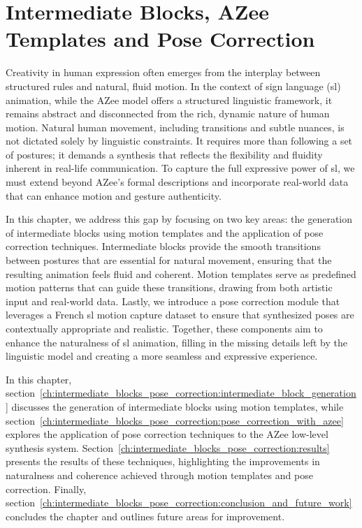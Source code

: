 \documentclass[../../main.tex]{subfiles}
\begin{document}
\chapter{Intermediate Blocks, AZee Templates and Pose Correction}
\label{ch:intermediate_blocks_pose_correction}

Creativity in human expression often emerges from the interplay between structured rules and natural, fluid motion. In the context of sign language (\gls{sl}) animation, while the AZee model offers a structured linguistic framework, it remains abstract and disconnected from the rich, dynamic nature of human motion. Natural human movement, including transitions and subtle nuances, is not dictated solely by linguistic constraints. It requires more than following a set of postures; it demands a synthesis that reflects the flexibility and fluidity inherent in real-life communication. To capture the full expressive power of \gls{sl}, we must extend beyond AZee's formal descriptions and incorporate real-world data that can enhance motion and gesture authenticity.

In this chapter, we address this gap by focusing on two key areas: the generation of intermediate blocks using motion templates and the application of pose correction techniques. Intermediate blocks provide the smooth transitions between postures that are essential for natural movement, ensuring that the resulting animation feels fluid and coherent. Motion templates serve as predefined motion patterns that can guide these transitions, drawing from both artistic input and real-world data. Lastly, we introduce a pose correction module that leverages a French \gls{sl} motion capture dataset to ensure that synthesized poses are contextually appropriate and realistic. Together, these components aim to enhance the naturalness of \gls{sl} animation, filling in the missing details left by the linguistic model and creating a more seamless and expressive experience.

In this chapter, section~\ref{ch:intermediate_blocks_pose_correction:intermediate_block_generation} discusses the generation of intermediate blocks using motion templates, while section~\ref{ch:intermediate_blocks_pose_correction:pose_correction_with_azee} explores the application of pose correction techniques to the AZee low-level synthesis system. Section~\ref{ch:intermediate_blocks_pose_correction:results} presents the results of these techniques, highlighting the improvements in naturalness and coherence achieved through motion templates and pose correction. Finally, section~\ref{ch:intermediate_blocks_pose_correction:conclusion_and_future_work} concludes the chapter and outlines future areas for improvement.
\end{document}

